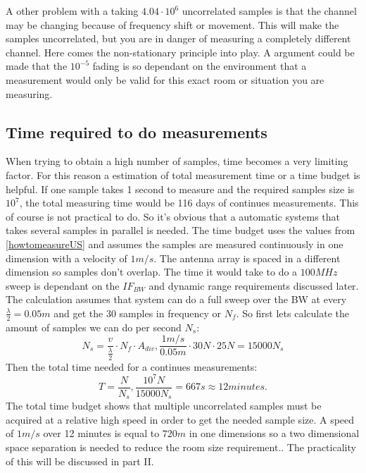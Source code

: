 A other problem with a taking $4.04\cdot10^6$  uncorrelated samples is that the channel may be changing because of frequency shift or movement. This will make the samples uncorrelated, but you are in danger of measuring a completely different channel. Here comes the non-stationary principle into play. A argument could be made that the $10^{-5}$ fading is so dependant on the environment that a measurement would only be valid for this exact room or situation you are measuring.

\subsection{Time required to do measurements}
When trying to obtain a high number of samples, time becomes a very limiting factor. For this reason a estimation of total measurement time or a time budget is helpful. If one sample takes 1 second to measure and the required samples size is $10^7$, the total measuring time would be 116 days of continues measurements. This of course is not practical to do. So it's obvious that a automatic systems that takes several samples in parallel is needed. The time budget uses the values from  \autoref{howtomeasureUS} and assumes the samples are measured continuously in one dimension with a velocity of $1m/s$. 
The antenna array is spaced in a different dimension so samples don't overlap. The time it would take to do a $100MHz$ sweep is dependant on the $IF_{BW}$ and dynamic range requirements discussed later. The calculation assumes that system can do a full sweep over the BW at every $\frac{\lambda}{2} = 0.05m$ and get the 30 samples in frequency or $N_f$. So first lets calculate the amount of samples we can do per second $N_s$:
\begin{equation}
N_s = \frac{v}{\frac{\lambda}{2}}\cdot N_f \cdot A_{div}, \frac{1m/s}{0.05m} \cdot 30N \cdot 25N = 15000N_s
\end{equation}
Then the total time needed for a continues measurements:
\begin{equation}
T = \frac{N}{N_s} , \frac{10^7N}{15000N_s} = 667s \approx 12 minutes.
\end{equation}
The total time budget shows that multiple uncorrelated samples must be acquired at a relative high speed in order to get the needed sample size. A speed of $1m/s$ over 12 minutes is equal to $720m$ in one dimensions so a two dimensional space separation is needed to reduce the room size requirement.. The practicality of this will be discussed in part II.
